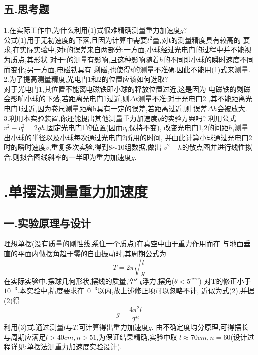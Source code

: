 \documentclass[12pt,a4paper,oneside]{ctexart}
\newcommand{\Rmnum}[1]{\uppercase\expandafter{\romannumeral #1\relax}}
\begin{document}
\subsection*{五.思考题}\noindent
1.在实际工作中,为什么利用(1)式很难精确测量重力加速度$g$?\\
\indent 公式(1)用于无初速度的下落,且因为计算中需要$t^2$量,对t的测量精度具有较高的
要求,在实际实验中,对t的误差来自两部分:一方面,小球经过光电门的过程中并不能视为质点,其形状
对于t的测量有影响,且这种影响随着$h$的不同即小球的瞬时速度不同而变化;另一方面,电磁铁具有
剩磁,也使得$t$的测量不准确.因此不能用(1)式来测量.\\
\noindent
2.为了提高测量精度,光电门1和2的位置应该如何选取?\\
\indent 对于光电门1,其位置不能离电磁铁即小球的释放位置过近,这是因为
电磁铁的剩磁会影响小球的下落,若距离光电门1过近,则$\Delta t$测量不准;对于光电门2
,其不能距离光电门1过近,因为卷尺测量距离h具有一定的误差,若距离过近,则
误差$\Delta h$会被放大.\\
\noindent
3.利用本实验装置,你还能提出其他测量重力加速度$g$的实验方案吗?
\indent 利用公式$v^2-v_0^2=2gh$,固定光电门1的位置(因而$v_0$保持不变),
改变光电门1,2的间距$h$,测量出小球的半径以及小球每次通过光电门2所用的时间,
并由此计算小球通过光电门2时的瞬时速度$v$,重复多次实验,得到8$\sim$10组数据,做出
$v^2-h$的散点图并进行线性拟合,则拟合图线斜率的一半即为重力加速度$g$.

\section{\Rmnum{4}.单摆法测量重力加速度}
\subsection*{一.实验原理与设计}
理想单摆(没有质量的刚性线,系住一个质点)在真空中由于重力作用而在
与地面垂直的平面内做摆角趋于零的自由振动时,其周期公式为
\begin{equation}
    T=2\pi\sqrt{\dfrac{l}{g}}
\end{equation}
在实际实验中,摆球几何形状,摆线的质量,空气浮力,摆角($\theta<5^{circ}$)
对T的修正小于$10^{-3}$.本实验中,精度要求在$10^{-3}$以内,故上述修正项可以忽略不计,
近似为式(2),并据(2)得
\begin{equation}
    g=\dfrac{4\pi^2l}{T^2}
\end{equation}
利用(3)式,通过测量$l$与$T$,可计算得出重力加速度$g$.
由不确定度均分原理,可得摆长与周期应满足$l>40cm,n>51$,为保证结果精确,实验中取
$l\approx70cm,n=60$(设计过程详见:单摆法测重力加速度实验设计).
\end{document}
